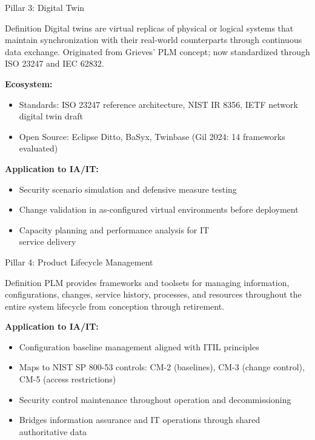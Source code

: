 \documentclass{beamer}
\begin{document}
\begin{frame}[allowframebreaks]{Pillar 3: Digital Twin}
  \begin{small}
    \begin{block}{Definition}
      Digital twins are virtual replicas of physical or logical systems that maintain synchronization with their real-world counterparts through continuous data exchange. Originated from Grieves' PLM concept; now standardized through ISO 23247 and IEC 62832.
    \end{block}

    \textbf{Ecosystem:}
    \begin{itemize}
      \item Standards: ISO 23247 reference architecture, NIST IR 8356, IETF network digital twin draft
      \item Open Source: Eclipse Ditto, BaSyx, Twinbase (Gil 2024: 14 frameworks evaluated)
    \end{itemize}

    \textbf{Application to IA/IT:}
    \begin{itemize}
      \item Security scenario simulation and defensive measure testing
      \item Change validation in as-configured virtual environments before deployment
      \item Capacity planning and performance analysis for IT \\ service delivery
    \end{itemize}
  \end{small}
\end{frame}

\begin{frame}[allowframebreaks]{Pillar 4: Product Lifecycle Management}
  \begin{small}
    \begin{block}{Definition}
      PLM provides frameworks and toolsets for managing information, configurations, changes, service history, processes, and resources throughout the entire system lifecycle from conception through retirement.
    \end{block}

    \textbf{Application to IA/IT:}
    \begin{itemize}
      \item Configuration baseline management aligned with ITIL principles
      \item Maps to NIST SP 800-53 controls: CM-2 (baselines), CM-3 (change control), CM-5 (access restrictions)
      \item Security control maintenance throughout operation and decommissioning
      \item Bridges information assurance and IT operations through shared authoritative data
    \end{itemize}
  \end{small}
\end{frame}
\end{document}
